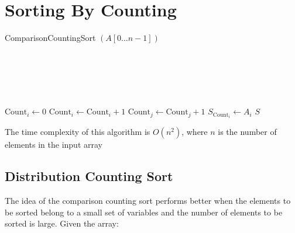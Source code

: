 \documentclass[12pt letter]{report}
\begin{document}
\section{Sorting By Counting}
\begin{algorithm}[H]
  \caption{ComparisonCountingSort $ \left( A \left[ 0 \ldots n - 1 \right]  \right) $}
  \Comment{}\\
  \\
   \\
   \\
  \begin{algorithmic}[1]
    \State  $\text{Count}_i \gets 0 $
    \EndFor
    \State $\text{Count}_i \gets \text{Count}_i + 1$
    \Else
    \State $ \text{Count}_j \gets \text{Count}_j + 1$
    \EndIf
    \EndFor
    \EndFor
    \State $S_{\text{Count}_i} \gets A_i $
    \EndFor
    \State \Return $S$
  \end{algorithmic}
\end{algorithm}
The time complexity of this algorithm is $O \left( n^2 \right) $, where $n$ is the number of elements in the input array

\subsection{Distribution Counting Sort}
The idea of the comparison counting sort performs better when the elements to be sorted belong to a small set of
variables and the number of elements to be sorted is large. Given the array:
\end{document}
